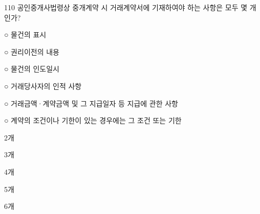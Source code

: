\begin{question}{110}
공인중개사법령상 중개계약 시 거래계약서에 기재하여야 하는 사항은 모두 몇 개인가?
\begin{framedtext}
○ 물건의 표시 \par
○ 권리이전의 내용 \par
○ 물건의 인도일시 \par
○ 거래당사자의 인적 사항 \par
○ 거래금액·계약금액 및 그 지급일자 등 지급에 관한 사항 \par
○ 계약의 조건이나 기한이 있는 경우에는 그 조건 또는 기한 \par
\end{framedtext}
\begin{choices}
  \item 2개
  \item 3개
  \item 4개
  \item 5개
  \item 6개
\end{choices}
\end{question}
